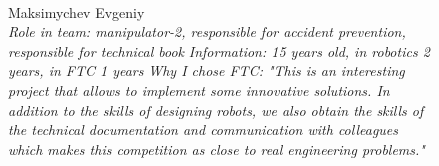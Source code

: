 \begin{figure}[H]
\begin{minipage}[h]{0.47\linewidth}
	\end{minipage}
	\hfill
	\begin{minipage}[h]{0.47\linewidth}
		\\
		Maksimychev Evgeniy\\
		\emph{Role in team: manipulator-2, responsible for accident prevention, responsible for technical book}
		\emph{Information: 15 years old, in robotics 2 years, in FTC 1 years}
		\emph{Why I chose FTC: "This is an interesting project that allows to implement some innovative solutions. In addition to the skills of designing robots, we also obtain the skills of the technical documentation and communication with colleagues which makes this competition as close to real engineering problems."}
	\end{minipage}
	\begin{minipage}[h]{0.47\linewidth}

\end{minipage}
\end{figure}
